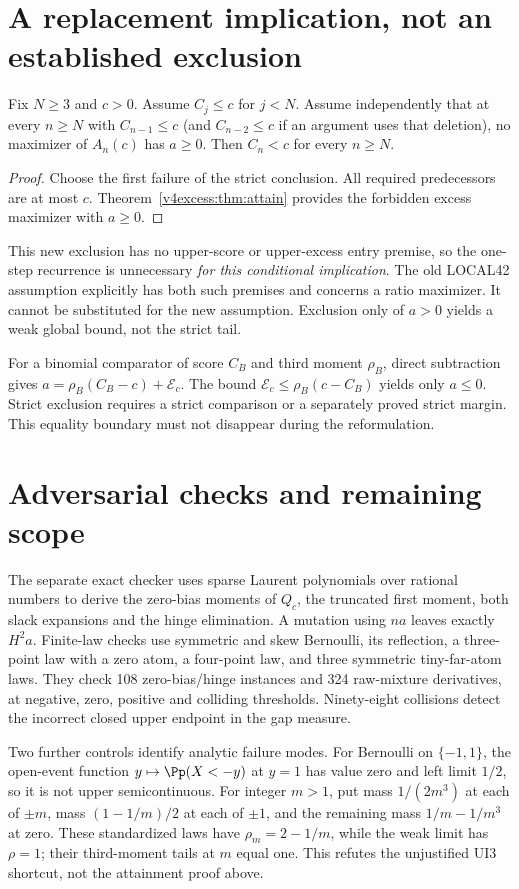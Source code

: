 \section{A replacement implication, not an established exclusion}
\begin{corollary}\label{v4excess:cor:global}
Fix $N\ge3$ and $c>0$. Assume $C_j\le c$ for $j<N$. Assume independently
that at every $n\ge N$ with $C_{n-1}\le c$ (and $C_{n-2}\le c$ if an
argument uses that deletion), no maximizer of $A_n(c)$ has $a\ge0$.
Then $C_n<c$ for every $n\ge N$.
\end{corollary}
\begin{proof}
Choose the first failure of the strict conclusion. All required
predecessors are at most $c$. Theorem~\ref{v4excess:thm:attain} provides the
forbidden excess maximizer with $a\ge0$.
\end{proof}
This new exclusion has no upper-score or upper-excess entry premise, so
the one-step recurrence is unnecessary \emph{for this conditional
implication}. The old LOCAL42 assumption explicitly has both such
premises and concerns a ratio maximizer. It cannot be substituted for
the new assumption. Exclusion only of $a>0$ yields a weak global bound,
not the strict tail.

For a binomial comparator of score $C_B$ and third moment $\rho_B$,
direct subtraction gives
$a=\rho_B(C_B-c)+\mathcal E_c$. The bound
$\mathcal E_c\le\rho_B(c-C_B)$ yields only $a\le0$.
Strict exclusion requires a strict comparison or a separately proved
strict margin. This equality boundary must not disappear during the
reformulation.

\section{Adversarial checks and remaining scope}
The separate exact checker uses sparse Laurent polynomials over rational
numbers to derive the zero-bias moments of $Q_c$, the truncated first
moment, both slack expansions and the hinge elimination. A mutation
using $na$ leaves exactly $H^2a$. Finite-law checks use symmetric and
skew Bernoulli, its reflection, a three-point law with a zero atom, a
four-point law, and three symmetric tiny-far-atom laws. They check 108
zero-bias/hinge instances and 324 raw-mixture derivatives, at negative,
zero, positive and colliding thresholds. Ninety-eight collisions detect
the incorrect closed upper endpoint in the gap measure.

Two further controls identify analytic failure modes. For Bernoulli on
$\{-1,1\}$, the open-event function
$y\mapsto\Pp(X<-y)$ at $y=1$ has value zero and left limit $1/2$, so it
is not upper semicontinuous. For integer $m>1$, put mass $1/(2m^3)$ at
each of $\pm m$, mass $(1-1/m)/2$ at each of $\pm1$, and the remaining
mass $1/m-1/m^3$ at zero. These standardized laws have
$\rho_m=2-1/m$, while the weak limit has $\rho=1$; their third-moment
tails at $m$ equal one. This refutes the unjustified UI3 shortcut, not
the attainment proof above.

